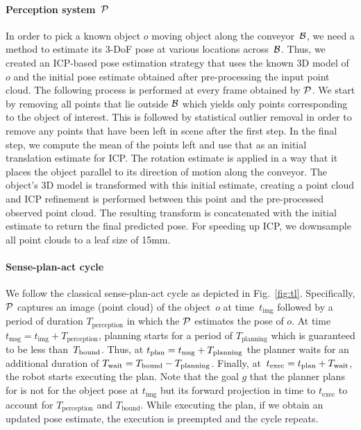 \documentclass[a4paper,10pt]{article}
\begin{document}
\paragraph{Perception system~$\mathcal{P}$}
In order to pick a known object $o$ moving object along the conveyor~$\mathcal{B}$, we need a method to estimate its 3-DoF pose at various locations across~$\mathcal{B}$. Thus, we created an ICP-based pose estimation strategy that uses the known 3D model of~$o$ and the initial pose estimate obtained after pre-processing the input point cloud. 
%
The following process is performed at every frame obtained by $\mathcal{P}$. 
We start by removing all points that lie outside $\mathcal{B}$ which yields only points corresponding to the object of interest. 
This is followed by statistical outlier removal in order to remove any points that have been left in scene after the first step. 
In the final step, we compute the mean of the points left and use that as an initial translation estimate for ICP. 
The rotation estimate is applied in a way that it places the object parallel to its direction of motion along the conveyor. The object's 3D model is transformed with this initial estimate, creating a point cloud and ICP refinement is performed between this point and the pre-processed observed point cloud. The resulting transform is concatenated with the initial estimate to return the final predicted pose. For speeding up ICP, we downsample all point clouds to a leaf size of 15mm.

\paragraph{Sense-plan-act cycle}
We follow the classical sense-plan-act cycle as depicted in Fig.~\ref{fig:tl}.
%
Specifically, 
$\mathcal{P}$ captures an image (point cloud) of the object~$o$ at time~$t_{\textrm{img}}$
followed by a period of duration $T_{\textrm{perception}}$ in which the $\mathcal{P}$ estimates the pose of $o$.
At time $t_{\textrm{msg}} = t_{\textrm{img}} + T_{\textrm{perception}}$, planning starts for a period of $T_{\textrm{planning}}$ which is guaranteed to be less than~$T_{\textrm{bound}}$.
Thus, at $t_{\textrm{plan}} = t_{\textrm{msg}} + T_{\rm planning}$ the planner waits for an additional duration of $T_{\rm wait} = T_{\textrm{bound}} - T_{\rm planning}$.
Finally, at~$t_{\textrm{exec}} = t_{\textrm{plan}} + T_{\rm wait}$, the robot starts executing the plan. Note that the goal $g$ that the planner plans for is not for the object pose at $t_{\textrm{img}}$ but its forward projection in time to $t_{\textrm{exec}}$ to account for $T_{\textrm{perception}}$ and $T_{\textrm{bound}}$.
While executing the plan, if we obtain an updated pose estimate, the execution is preempted and the cycle repeats.
\end{document}
